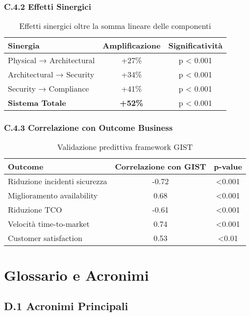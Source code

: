 \subsection{C.4.2 Effetti Sinergici}

\begin{table}[htbp]
\centering
\begin{tabular}{lcc}
\toprule
\textbf{Sinergia} & \textbf{Amplificazione} & \textbf{Significatività} \\
\midrule
Physical → Architectural & +27\% & p < 0.001 \\
Architectural → Security & +34\% & p < 0.001 \\
Security → Compliance & +41\% & p < 0.001 \\
\textbf{Sistema Totale} & \textbf{+52\%} & p < 0.001 \\
\bottomrule
\end{tabular}
\caption{Effetti sinergici oltre la somma lineare delle componenti}
\end{table}

\subsection{C.4.3 Correlazione con Outcome Business}

\begin{table}[htbp]
\centering
\begin{tabular}{lcc}
\toprule
\textbf{Outcome} & \textbf{Correlazione con GIST} & \textbf{p-value} \\
\midrule
Riduzione incidenti sicurezza & -0.72 & <0.001 \\
Miglioramento availability & 0.68 & <0.001 \\
Riduzione TCO & -0.61 & <0.001 \\
Velocità time-to-market & 0.74 & <0.001 \\
Customer satisfaction & 0.53 & <0.01 \\
\bottomrule
\end{tabular}
\caption{Validazione predittiva framework GIST}
\end{table}

\chapter{Glossario e Acronimi}

\section{D.1 Acronimi Principali}

